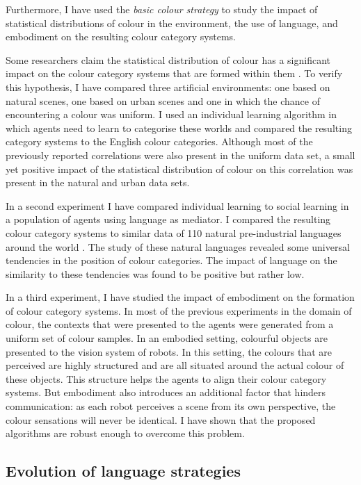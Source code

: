 Furthermore, I have used the \emph{basic colour strategy} to study the
impact of statistical distributions of colour in the environment, the
use of language, and embodiment on the resulting colour category
systems.

Some researchers claim the statistical distribution of colour has a
significant impact on the colour category systems that are formed
within them \citep{yendrikhovskij01computational}. To verify this
hypothesis, I have compared three artificial environments: one based
on natural scenes, one based on urban scenes and one in which the
chance of encountering a colour was uniform. I used an individual
learning algorithm in which agents need to learn to categorise these
worlds and compared the resulting category systems to the English
colour categories. Although most of the previously reported
correlations were also present in the uniform data set, a small yet
positive impact of the statistical distribution of colour on this
correlation was present in the natural and urban data sets.

In a second experiment I have compared individual learning to social
learning in a population of agents using language as mediator. I
compared the resulting colour category systems to similar data of 110
natural pre-industrial languages around the world
\citep{kay10world}. The study of these natural languages revealed
some universal tendencies in the position of colour categories. The
impact of language on the similarity to these tendencies was found to
be positive but rather low.

In a third experiment, I have studied the impact of embodiment on the
formation of colour category systems. In most of the previous
experiments in the domain of colour, the contexts that were presented
to the agents were generated from a uniform set of colour samples. In
an embodied setting, colourful objects are presented to the vision
system of robots. In this setting, the colours that are perceived are
highly structured and are all situated around the actual colour of
these objects. This structure helps the agents to align
their colour category systems. But embodiment also introduces an
additional factor that hinders communication: as each robot perceives
a scene from its own perspective, the colour sensations will never be
identical. I have shown that the proposed algorithms are robust enough
to overcome this problem.

\subsection{Evolution of language strategies}


